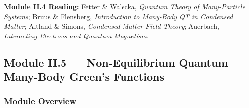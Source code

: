 \documentclass[11pt,a4paper]{article}
\begin{document}
\begin{tcolorbox}[highlightbox]
\textbf{Module II.4 Reading:} Fetter \& Walecka, \textit{Quantum Theory of Many-Particle Systems}; Bruus \& Flensberg, \textit{Introduction to Many-Body QT in Condensed Matter}; Altland \& Simons, \textit{Condensed Matter Field Theory}; Auerbach, \textit{Interacting Electrons and Quantum Magnetism}.
\end{tcolorbox}

\subsection{Module II.5 --- Non-Equilibrium Quantum Many-Body Green's Functions}
\label{sec:mod-II5}

\subsubsection*{Module Overview}
\end{document}
